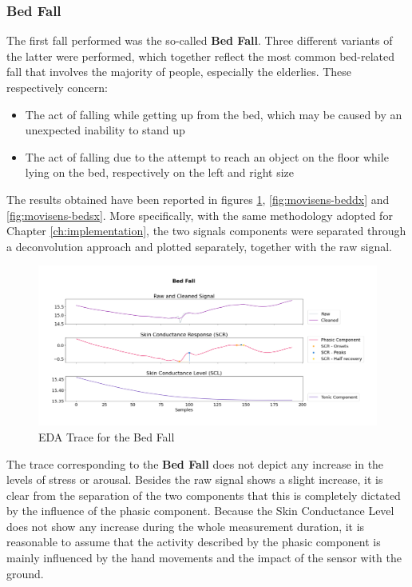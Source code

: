 \subsubsection{Bed Fall}\label{subsubsec:bed-fall}

The first fall performed was the so-called \textbf{Bed Fall}. Three different variants of the latter were performed, which together reflect the most common bed-related fall that involves the majority of people, especially the elderlies. These respectively concern: 

\begin{itemize}
    \item The act of falling while getting up from the bed, which may be caused by an unexpected inability to stand up 
    \item The act of falling due to the attempt to reach an object on the floor while lying on the bed, respectively on the left and right size
\end{itemize}

The results obtained have been reported in figures \ref{fig:movisens-bed}, \ref{fig:movisens-beddx} and \ref{fig:movisens-bedsx}. More specifically, with the same methodology adopted for Chapter \ref{ch:implementation}, the two signals components were separated through a deconvolution approach and plotted separately, together with the raw signal.

\begin{figure}[H]
    \centering
    \includegraphics[width=\textwidth]{./images/movisens/Bed.png}
    \caption{EDA Trace for the Bed Fall}
    \label{fig:movisens-bed}
\end{figure}

The trace corresponding to the \textbf{Bed Fall} does not depict any increase in the levels of stress or arousal. Besides the raw signal shows a slight increase, it is clear from the separation of the two components that this is completely dictated by the influence of the phasic component. Because the Skin Conductance Level does not show any increase during the whole measurement duration, it is reasonable to assume that the activity described by the phasic component is mainly influenced by the hand movements and the impact of the sensor with the ground.

